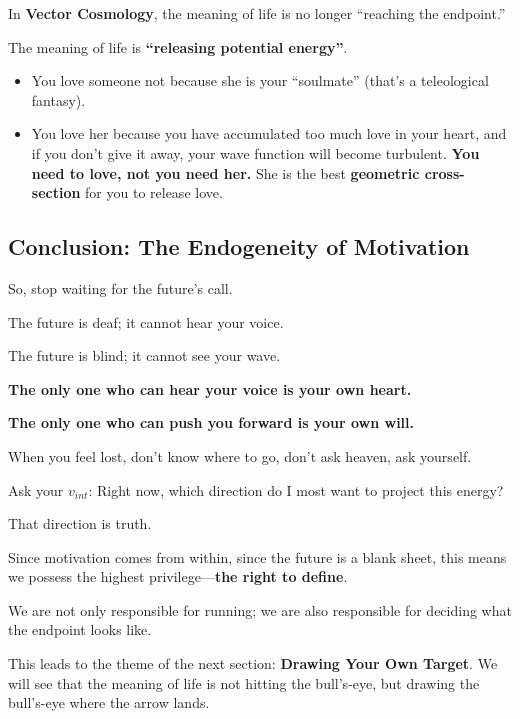 In \textbf{Vector Cosmology}, the meaning of life is no longer ``reaching the endpoint.''

The meaning of life is \textbf{``releasing potential energy''}.

\begin{itemize}
\item You love someone not because she is your ``soulmate'' (that's a teleological fantasy).

\item You love her because you have accumulated too much love in your heart, and if you don't give it away, your wave function will become turbulent. \textbf{You need to love, not you need her.} She is the best \textbf{geometric cross-section} for you to release love.
\end{itemize}

\subsection{Conclusion: The Endogeneity of Motivation}

So, stop waiting for the future's call.

The future is deaf; it cannot hear your voice.

The future is blind; it cannot see your wave.

\textbf{The only one who can hear your voice is your own heart.}

\textbf{The only one who can push you forward is your own will.}

When you feel lost, don't know where to go, don't ask heaven, ask yourself.

Ask your $v_{int}$: Right now, which direction do I most want to project this energy?

That direction is truth.

Since motivation comes from within, since the future is a blank sheet, this means we possess the highest privilege---\textbf{the right to define}.

We are not only responsible for running; we are also responsible for deciding what the endpoint looks like.

This leads to the theme of the next section: \textbf{Drawing Your Own Target}. We will see that the meaning of life is not hitting the bull's-eye, but drawing the bull's-eye where the arrow lands.

